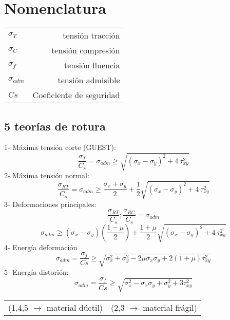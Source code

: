 \documentclass[11pt,a4paper]{article}
\begin{document}
\pagestyle{pieyencabezado}

\begin{multicols}{2}
	\section*{Nomenclatura}
	\begin{tabular}{l r}
		$\sigma_{T}$&tensión tracción \\
		$\sigma_{C}$&tensión compresión\\
		$\sigma_{f}$&tensión fluencia\\
		$\sigma_{adm}$&tensión admisible\\
		$Cs$&Coeficiente de seguridad\\
	\end{tabular}
	
	\begin{cajita}
		\section*{5 teorías de rotura}
		\begin{flushleft}
			1- Máxima tensión corte (GUEST):
			\begin{equation*}
				\dfrac{\sigma_{T}}{C_{s}}=\sigma_{adm}\geq\sqrt{(\sigma_{x}-\sigma_{y})^{2}+4~\tau_{xy}^{2}}
			\end{equation*}
			2- Máxima tensión normal:
			\begin{equation*}
				\dfrac{\sigma_{RT}}{C_{s}}=\sigma_{adm}\geq\dfrac{\sigma_{x}+\sigma_{y}}{2}+\dfrac{1}{2}\sqrt{(\sigma_{x}-\sigma_{y})^{2}+4~\tau_{xy}^{2}}
			\end{equation*}
			3- Deformaciones principales:
			\begin{equation*}
				\dfrac{\sigma_{RT}}{C_{s}};\dfrac{\sigma_{RC}}{C_{s}}=\sigma_{adm}
			\end{equation*}
			\begin{equation*}
				\sigma_{adm}\geq(\sigma_{x}-\sigma_{y})\left(\dfrac{1-\mu}{2}\right)\pm\dfrac{1+\mu}{2}\sqrt{(\sigma_{x}-\sigma_{y})^{2}+4~\tau_{xy}^{2}}
			\end{equation*}
			4- Energía deformación
			\begin{equation*}
				\sigma_{adm}=\dfrac{\sigma_{f}}{Cs}\geq\sqrt{\sigma_{x}^{2}+\sigma_{y}^{2}-2\mu \sigma_{x} \sigma_{y} +2(1+\mu)\tau_{xy}^{2}}
			\end{equation*}
			5- Energía distorión:
			\begin{equation*}
				\sigma_{adm}=\dfrac{\sigma_{f}}{Cs}\geq\sqrt{\sigma_{x}^{2}-\sigma_{x} \sigma_{y}+\sigma_{y}^{2}+3\tau_{xy}^{2}}			
			\end{equation*}
		\end{flushleft}
		\begin{tabular}{l r}
			(1,4,5 $\rightarrow$ material dúctil) & (2,3 $\rightarrow$ material frágil)
		\end{tabular}
		

\end{cajita}
\end{multicols}
\end{document}
